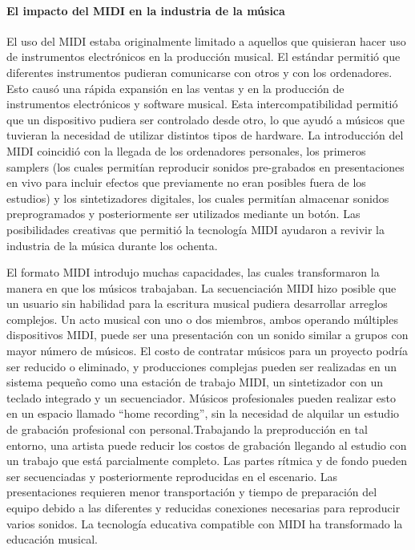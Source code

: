 \documentclass[a4paper,11pt,oneside]{book}
\begin{document}
\paragraph{El impacto del MIDI en la industria de la música}

El uso del MIDI estaba originalmente limitado a aquellos que quisieran hacer uso de instrumentos electrónicos en la producción musical. El estándar permitió que diferentes instrumentos pudieran comunicarse con otros y con los ordenadores. Esto causó una rápida expansión en las ventas y en la producción de instrumentos electrónicos y software musical. Esta intercompatibilidad permitió que un dispositivo pudiera ser controlado desde otro, lo que ayudó a músicos que tuvieran la necesidad de utilizar distintos tipos de hardware. La introducción del MIDI coincidió con la llegada de los ordenadores personales, los primeros samplers (los cuales permitían reproducir sonidos pre-grabados en presentaciones en vivo para incluir efectos que previamente no eran posibles fuera de los estudios) y los sintetizadores digitales, los cuales permitían almacenar sonidos preprogramados y posteriormente ser utilizados mediante un botón. Las posibilidades creativas que permitió la tecnología MIDI ayudaron a revivir la industria de la música durante los ochenta.

El formato MIDI introdujo muchas capacidades, las cuales transformaron la manera en que los músicos trabajaban. La secuenciación MIDI hizo posible que un usuario sin habilidad para la escritura musical pudiera desarrollar arreglos complejos. Un acto musical con uno o dos miembros, ambos operando múltiples dispositivos MIDI, puede ser una presentación con un sonido similar a grupos con mayor número de músicos. El costo de contratar músicos para un proyecto podría ser reducido o eliminado, y producciones complejas pueden ser realizadas en un sistema pequeño como una estación de trabajo MIDI, un sintetizador con un teclado integrado y un secuenciador. Músicos profesionales pueden realizar esto en un espacio llamado ``home recording'', sin la necesidad de alquilar un estudio de grabación profesional con personal.Trabajando la preproducción en tal entorno, una artista puede reducir los costos de grabación llegando al estudio con un trabajo que está parcialmente completo.
Las partes rítmica y de fondo pueden ser secuenciadas y posteriormente reproducidas en el escenario. Las presentaciones requieren menor transportación y tiempo de preparación del equipo debido a las diferentes y reducidas conexiones necesarias para reproducir varios sonidos. La tecnología educativa compatible con MIDI ha transformado la educación musical.
\end{document}
